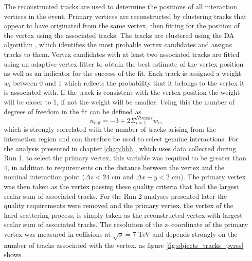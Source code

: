 The reconstructed tracks are used to determine the positions of all interaction
vertices in the event. Primary vertices are reconstructed by clustering
tracks that appear to have originated from the same vertex, then fitting 
for the position of the vertex using the associated tracks. The tracks 
are clustered using the \ac{DA} algorithm \cite{vtx-da}, which identifies
the most probable vertex candidates and assigns tracks to them. Vertex
candidates with at least two associated tracks are fitted using an adaptive
vertex fitter \cite{vtx-adaptivefit} to obtain the best estimate
of the vertex position as well as an indicator for the success of the fit.
Each track is assigned a weight $w_i$ between 0 and 1 which reflects the probability
that it belongs to the vertex it is associated with. If the track is consistent
with the vertex position the weight will be closer to 1, if not the weight 
will be smaller. Using this the number of degrees of freedom in the fit
can be defined as
\begin{equation}\label{eqn:pv_ndof}
n_{\text{dof}} = -3 + 2 \Sigma_{i=1}^{Ntracks}w_i,
\end{equation}
which is strongly correlated with the number of tracks arising from the interaction region
and can therefore be used to select genuine interactions. For the analysis
presented in chapter \ref{chap:hhh}, which uses data collected during Run 1, to select the primary vertex, 
this variable
was required to be greater than 4, in addition to requirements on the distance between
the vertex and the nominal interaction point ($\Delta z < 24$ cm and $\Delta x-y < 2$ cm). 
The primary vertex was then taken as the vertex passing these quality criteria that 
had the largest scalar sum \pT of associated tracks. For the Run 2 analyses presented
later the quality requirements were removed and the primary vertex, the vertex
of the hard scattering process, is simply taken as the reconstructed vertex with
largest scalar sum \pT of associated tracks.
The resolution of the z--coordinate of the primary vertex was measured in
collisions at $\sqrt{s}=7$ TeV and depends strongly on the number of tracks
associated with the vertex, as figure \ref{fig:objects_tracks_pvres} shows.

